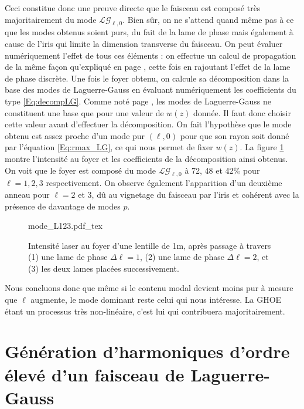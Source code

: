 Ceci constitue donc une preuve directe que le faisceau est composé très majoritairement du mode $\mathcal{LG}_{\ell,0}$. Bien sûr, on ne s'attend quand même pas à ce que les modes obtenus soient purs, du fait de la lame de phase mais également à cause de l'iris qui limite la dimension transverse du faisceau. On peut évaluer numériquement l'effet de tous ces éléments : on effectue un calcul de propagation de la même façon qu'expliqué en page \pageref{Fig:IrisScan}, cette fois en rajoutant l'effet de la lame de phase discrète. Une fois le foyer obtenu, on calcule sa décomposition dans la base des modes de Laguerre-Gauss en évaluant numériquement les coefficients du type \ref{Eq:decompLG}. Comme noté page \pageref{Eq:rmax_LG}, les modes de Laguerre-Gauss ne constituent une base que pour une valeur de $w(z)$ donnée. Il faut donc choisir cette valeur avant d'effectuer la décomposition. On fait l'hypothèse que le mode obtenu est assez proche d'un mode pur $(\ell,0)$ pour que son rayon soit donné par l'équation \ref{Eq:rmax_LG}, ce qui nous permet de fixer $w(z)$. La figure \ref{Fig:DecompIR} montre l'intensité au foyer et les coefficients de la décomposition ainsi obtenus. On voit que le foyer est composé du mode $\mathcal{LG}_{\ell,0}$ à 72, 48 et 42\% pour $\ell=1,2,3$ respectivement. On observe également l'apparition d'un deuxième anneau pour $\ell =2$ et 3, dû au vignetage du faisceau par l'iris et cohérent avec la présence de davantage de modes $p$. \par

\begin{figure}[!ht]
\centering
\def\svgwidth{\columnwidth}
{mode_L123.pdf_tex}
\caption{Intensité laser au foyer d'une lentille de 1m, après passage à travers (1) une lame de phase $\Delta\ell = 1$, (2) une lame de phase $\Delta\ell = 2$, et (3) les deux lames placées successivement.}
\label{Fig:DecompIR}
\end{figure}

Nous concluons donc que même si le contenu modal devient moins pur à mesure que $\ell$ augmente, le mode dominant reste celui qui nous intéresse. La GHOE étant un processus très non-linéaire, c'est lui qui contribuera majoritairement. 

\section{Génération d'harmoniques d'ordre élevé d'un faisceau de Laguerre-Gauss}
